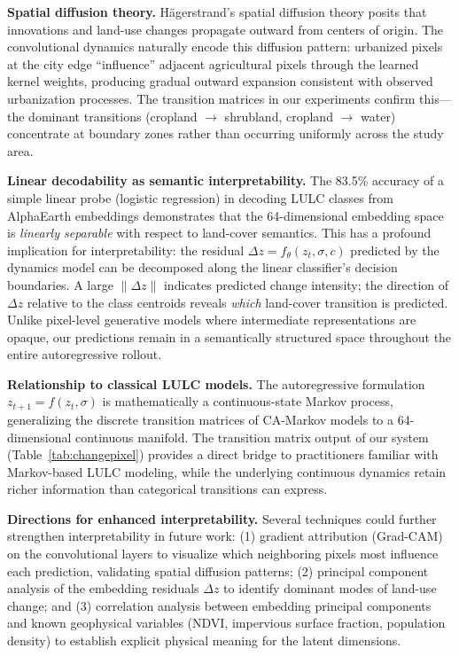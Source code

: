 \documentclass{article}
\begin{document}
\textbf{Spatial diffusion theory.}
H\"{a}gerstrand's spatial diffusion theory posits that innovations and land-use changes propagate outward from centers of origin. The convolutional dynamics naturally encode this diffusion pattern: urbanized pixels at the city edge ``influence'' adjacent agricultural pixels through the learned kernel weights, producing gradual outward expansion consistent with observed urbanization processes. The transition matrices in our experiments confirm this---the dominant transitions (cropland $\to$ shrubland, cropland $\to$ water) concentrate at boundary zones rather than occurring uniformly across the study area.

\textbf{Linear decodability as semantic interpretability.}
The 83.5\% accuracy of a simple linear probe (logistic regression) in decoding LULC classes from AlphaEarth embeddings \citep{rahman2026interpretable} demonstrates that the 64-dimensional embedding space is \textit{linearly separable} with respect to land-cover semantics. This has a profound implication for interpretability: the residual $\Delta z = f_\theta(z_t, \sigma, c)$ predicted by the dynamics model can be decomposed along the linear classifier's decision boundaries. A large $\|\Delta z\|$ indicates predicted change intensity; the direction of $\Delta z$ relative to the class centroids reveals \textit{which} land-cover transition is predicted. Unlike pixel-level generative models where intermediate representations are opaque, our predictions remain in a semantically structured space throughout the entire autoregressive rollout.

\textbf{Relationship to classical LULC models.}
The autoregressive formulation $z_{t+1} = f(z_t, \sigma)$ is mathematically a continuous-state Markov process, generalizing the discrete transition matrices of CA-Markov models to a 64-dimensional continuous manifold. The transition matrix output of our system (Table~\ref{tab:changepixel}) provides a direct bridge to practitioners familiar with Markov-based LULC modeling, while the underlying continuous dynamics retain richer information than categorical transitions can express.

\textbf{Directions for enhanced interpretability.}
Several techniques could further strengthen interpretability in future work: (1) gradient attribution (Grad-CAM) on the convolutional layers to visualize which neighboring pixels most influence each prediction, validating spatial diffusion patterns; (2) principal component analysis of the embedding residuals $\Delta z$ to identify dominant modes of land-use change; and (3) correlation analysis between embedding principal components and known geophysical variables (NDVI, impervious surface fraction, population density) to establish explicit physical meaning for the latent dimensions.
\end{document}
